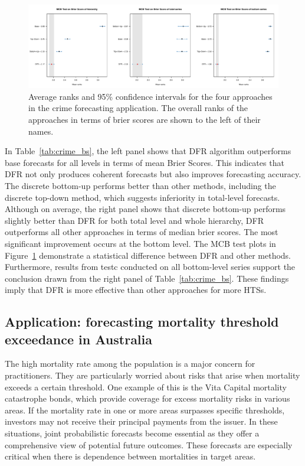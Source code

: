 \documentclass[a4paper,review,12pt,authoryear]{elsarticle}
\begin{document}
     \begin{figure}[h]
       \caption{\label{fig:application_crime}Average ranks and 95\% confidence intervals for the four approaches in the crime forecasting application. The overall ranks of the approaches in terms of brier scores are shown to the left of their names.}
       \centering
       \includegraphics[width=\textwidth]{figures/dc_crime_bs.pdf}
     \end{figure}
     
     
     In Table~\ref{tab:crime_bs}, the left panel shows that DFR algorithm outperforms base forecasts for all levels in terms of mean Brier Scores. This indicates that DFR not only produces coherent forecasts but also improves forecasting accuracy.
     The discrete bottom-up performs better than other methods, including the discrete top-down method, which suggests inferiority in total-level forecasts. 
     Although on average, the right panel shows that discrete bottom-up performs slightly better than DFR for both total level and whole hierarchy, DFR outperforms all other approaches in terms of median brier scores.
     The most significant improvement occurs at the bottom level.
     The MCB test plots in Figure~\ref{fig:application_crime} demonstrate a statistical difference between DFR and other methods.
     Furthermore, results from testc conducted on all bottom-level series support the conclusion drawn from the right panel of Table~\ref{tab:crime_bs}.
     These findings imply that DFR is more effective than other approaches for more HTSs. 
     
     \subsection{Application: forecasting mortality threshold exceedance in Australia}
     \label{sec:application_mortality}
     The high mortality rate among the population is a major concern for practitioners. 
     They are particularly worried about risks that arise when mortality exceeds a certain threshold. 
     One example of this is the Vita Capital mortality catastrophe bonds, which provide coverage for excess mortality risks in various areas. 
     If the mortality rate in one or more areas surpasses specific thresholds, investors may not receive their principal payments from the issuer.
     In these situations, joint probabilistic forecasts become essential as they offer a comprehensive view of potential future outcomes. 
     These forecasts are especially critical when there is dependence between mortalities in target areas.
     
\end{document}
